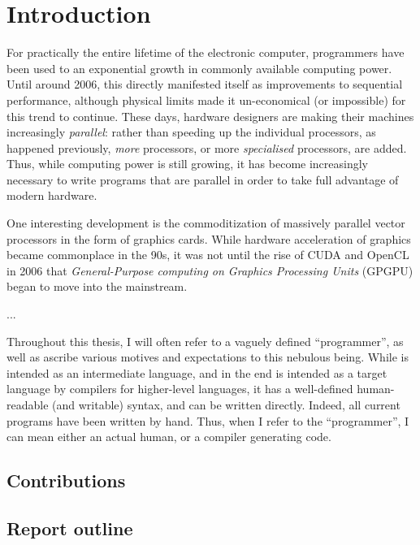 \chapter{Introduction}

For practically the entire lifetime of the electronic computer,
programmers have been used to an exponential growth in commonly
available computing power.  Until around 2006, this directly
manifested itself as improvements to sequential performance, although
physical limits made it un-economical (or impossible) for this trend
to continue.  These days, hardware designers are making their machines
increasingly \textit{parallel}: rather than speeding up the individual
processors, as happened previously, \textit{more} processors, or more
\textit{specialised} processors, are added.  Thus, while computing
power is still growing, it has become increasingly necessary to write
programs that are parallel in order to take full advantage of modern
hardware.

One interesting development is the commoditization of massively
parallel vector processors in the form of graphics cards.  While
hardware acceleration of graphics became commonplace in the 90s, it
was not until the rise of CUDA and OpenCL in 2006 that
\textit{General-Purpose computing on Graphics Processing Units}
(GPGPU) began to move into the mainstream.

... 

Throughout this thesis, I will often refer to a vaguely defined
``programmer'', as well as ascribe various motives and expectations to
this nebulous being.  While \LO{} is intended as an intermediate
language, and in the end is intended as a target language by compilers
for higher-level languages, it has a well-defined human-readable (and
writable) syntax, and can be written directly.  Indeed, all current
\LO{} programs have been written by hand.  Thus, when I refer to the
``programmer'', I can mean either an actual human, or a compiler
generating \LO{} code.

\section{Contributions}


\section{Report outline}

